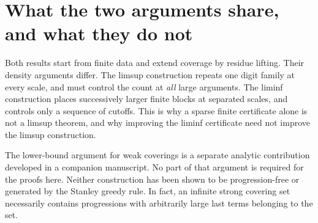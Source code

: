\documentclass[11pt]{article}
\theoremstyle{definition}\newtheorem{definition}[theorem]{Definition}
\theoremstyle{remark}\newtheorem{remark}[theorem]{Remark}
\numberwithin{equation}{section}
\begin{document}
\section{What the two arguments share, and what they do not}
Both results start from finite data and extend coverage by residue lifting. Their density arguments differ. The limsup construction repeats one digit family at every scale, and must control the count at \emph{all} large arguments. The liminf construction places successively larger finite blocks at separated scales, and controls only a sequence of cutoffs. This is why a sparse finite certificate alone is not a limsup theorem, and why improving the liminf certificate need not improve the limsup construction.

The lower-bound argument for weak coverings is a separate analytic contribution developed in a companion manuscript. No part of that argument is required for the proofs here. Neither construction has been shown to be progression-free or generated by the Stanley greedy rule. In fact, an infinite strong covering set necessarily contains progressions with arbitrarily large last terms belonging to the set.

\appendix
\end{document}
